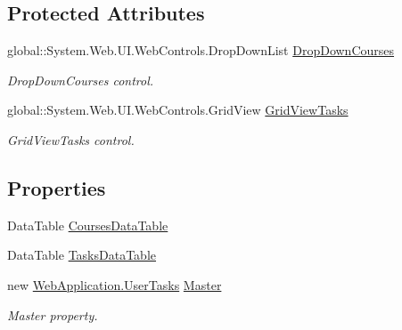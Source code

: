 \subsection*{Protected Attributes}
\begin{DoxyCompactItemize}
\item 
global\+::\+System.\+Web.\+U\+I.\+Web\+Controls.\+Drop\+Down\+List \mbox{\hyperlink{classWebApplication_1_1UserPage_1_1TareasAlumno_a7fbd883512b50dbc46ea6e9cfc081c75}{Drop\+Down\+Courses}}
\begin{DoxyCompactList}\small\item\em Drop\+Down\+Courses control. \end{DoxyCompactList}\item 
global\+::\+System.\+Web.\+U\+I.\+Web\+Controls.\+Grid\+View \mbox{\hyperlink{classWebApplication_1_1UserPage_1_1TareasAlumno_ac86a63bef568e016d56b44578e6077c7}{Grid\+View\+Tasks}}
\begin{DoxyCompactList}\small\item\em Grid\+View\+Tasks control. \end{DoxyCompactList}\end{DoxyCompactItemize}
\subsection*{Properties}
\begin{DoxyCompactItemize}
\item 
Data\+Table \mbox{\hyperlink{classWebApplication_1_1UserPage_1_1TareasAlumno_ab657733e60acfbfabf30b38472cccabb}{Courses\+Data\+Table}}
\item 
Data\+Table \mbox{\hyperlink{classWebApplication_1_1UserPage_1_1TareasAlumno_a8821f4d83835e4451c0bcc48fea3001f}{Tasks\+Data\+Table}}
\item 
new \mbox{\hyperlink{classWebApplication_1_1UserTasks}{Web\+Application.\+User\+Tasks}} \mbox{\hyperlink{classWebApplication_1_1UserPage_1_1TareasAlumno_a9d8e8d7a4a4ef52ae6a5795e0094b94f}{Master}}
\begin{DoxyCompactList}\small\item\em Master property. \end{DoxyCompactList}\end{DoxyCompactItemize}
